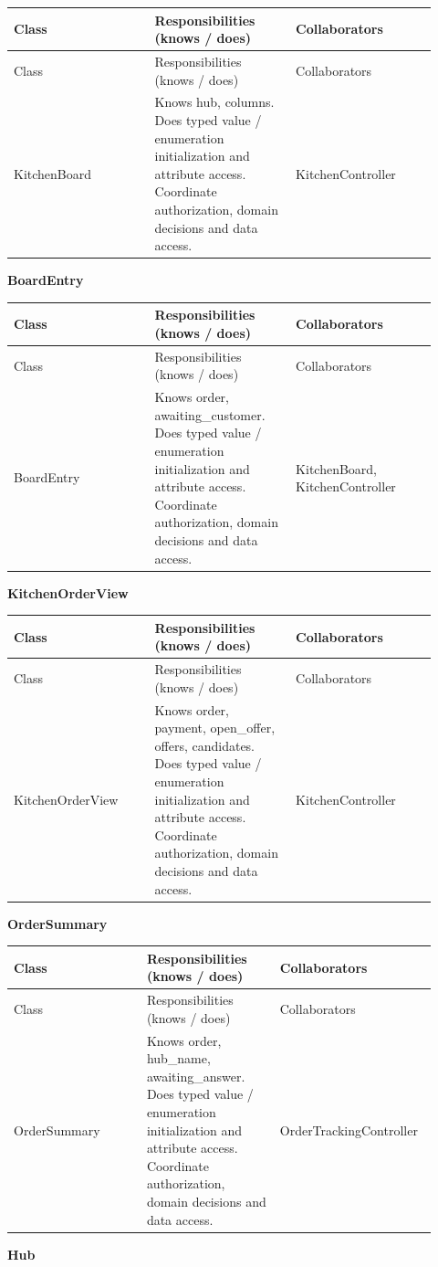 \begin{longtable}{>{\raggedright\arraybackslash}p{0.3067\linewidth}>{\raggedright\arraybackslash}p{0.3067\linewidth}>{\raggedright\arraybackslash}p{0.3067\linewidth}}
Class & Responsibilities (knows / does) & Collaborators \\
\hline\endfirsthead
Class & Responsibilities (knows / does) & Collaborators \\
\hline\endhead
KitchenBoard & Knows hub, columns. Does typed value / enumeration initialization and attribute access. Coordinate authorization, domain decisions and data access. & KitchenController \\
\end{longtable}
\textbf{BoardEntry}

\begin{longtable}{>{\raggedright\arraybackslash}p{0.3067\linewidth}>{\raggedright\arraybackslash}p{0.3067\linewidth}>{\raggedright\arraybackslash}p{0.3067\linewidth}}
Class & Responsibilities (knows / does) & Collaborators \\
\hline\endfirsthead
Class & Responsibilities (knows / does) & Collaborators \\
\hline\endhead
BoardEntry & Knows order, awaiting\_customer. Does typed value / enumeration initialization and attribute access. Coordinate authorization, domain decisions and data access. & KitchenBoard, KitchenController \\
\end{longtable}
\textbf{KitchenOrderView}

\begin{longtable}{>{\raggedright\arraybackslash}p{0.3067\linewidth}>{\raggedright\arraybackslash}p{0.3067\linewidth}>{\raggedright\arraybackslash}p{0.3067\linewidth}}
Class & Responsibilities (knows / does) & Collaborators \\
\hline\endfirsthead
Class & Responsibilities (knows / does) & Collaborators \\
\hline\endhead
KitchenOrderView & Knows order, payment, open\_offer, offers, candidates. Does typed value / enumeration initialization and attribute access. Coordinate authorization, domain decisions and data access. & KitchenController \\
\end{longtable}
\textbf{OrderSummary}

\begin{longtable}{>{\raggedright\arraybackslash}p{0.3067\linewidth}>{\raggedright\arraybackslash}p{0.3067\linewidth}>{\raggedright\arraybackslash}p{0.3067\linewidth}}
Class & Responsibilities (knows / does) & Collaborators \\
\hline\endfirsthead
Class & Responsibilities (knows / does) & Collaborators \\
\hline\endhead
OrderSummary & Knows order, hub\_name, awaiting\_answer. Does typed value / enumeration initialization and attribute access. Coordinate authorization, domain decisions and data access. & OrderTrackingController \\
\end{longtable}
\textbf{Hub}

